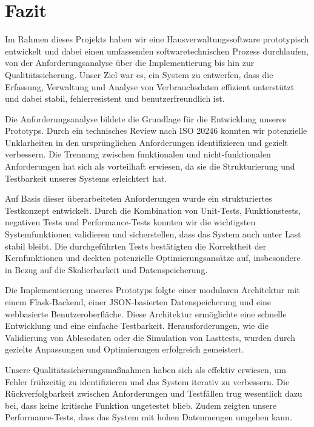 \newpage
\section{Fazit}\label{sec:fazit}

Im Rahmen dieses Projekts haben wir eine Hausverwaltungssoftware prototypisch entwickelt und dabei einen umfassenden softwaretechnischen Prozess durchlaufen, von der Anforderungsanalyse über die Implementierung bis hin zur Qualitätssicherung.
Unser Ziel war es, ein System zu entwerfen, dass die Erfassung, Verwaltung und Analyse von Verbrauchsdaten effizient unterstützt und dabei stabil, fehlerresistent und benutzerfreundlich ist.

Die Anforderungsanalyse bildete die Grundlage für die Entwicklung unseres Prototyps.
Durch ein technisches Review nach ISO 20246 konnten wir potenzielle Unklarheiten in den ursprünglichen Anforderungen identifizieren und gezielt verbessern.
Die Trennung zwischen funktionalen und nicht-funktionalen Anforderungen hat sich als vorteilhaft erwiesen, da sie die Strukturierung und Testbarkeit unseres Systems erleichtert hat.

Auf Basis dieser überarbeiteten Anforderungen wurde ein strukturiertes Testkonzept entwickelt.
Durch die Kombination von Unit-Tests, Funktionstests, negativen Tests und Performance-Tests konnten wir die wichtigsten Systemfunktionen validieren und sicherstellen, dass das System auch unter Last stabil bleibt.
Die durchgeführten Tests bestätigten die Korrektheit der Kernfunktionen und deckten potenzielle Optimierungsansätze auf, insbesondere in Bezug auf die Skalierbarkeit und Datenspeicherung.

Die Implementierung unseres Prototyps folgte einer modularen Architektur mit einem Flask-Backend, einer JSON-basierten Datenspeicherung und eine webbasierte Benutzeroberfläche.
Diese Architektur ermöglichte eine schnelle Entwicklung und eine einfache Testbarkeit.
Herausforderungen, wie die Validierung von Ablesedaten oder die Simulation von Lasttests, wurden durch gezielte Anpassungen und Optimierungen erfolgreich gemeistert.

Unsere Qualitätssicherungsmaßnahmen haben sich als effektiv erwiesen, um Fehler frühzeitig zu identifizieren und das System iterativ zu verbessern. 
Die Rückverfolgbarkeit zwischen Anforderungen und Testfällen trug wesentlich dazu bei, dass keine kritische Funktion ungetestet blieb.
Zudem zeigten unsere Performance-Tests, dass das System mit hohen Datenmengen umgehen kann.

